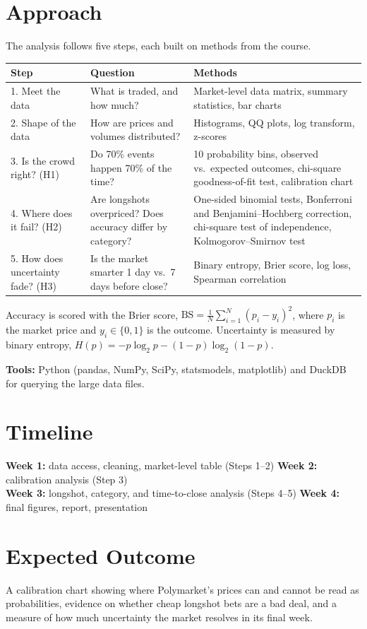 \documentclass[10pt]{article}
\begin{document}
\section{Approach}
The analysis follows five steps, each built on methods from the course.

\begin{tabularx}{\textwidth}{@{}l Y Y@{}}
\toprule
\textbf{Step} & \textbf{Question} & \textbf{Methods} \\
. Meet the data & What is traded, and how much? & Market-level data matrix, summary statistics, bar charts \\
2. Shape of the data & How are prices and volumes distributed? & Histograms, QQ plots, log transform, z-scores \\
3. Is the crowd right? (H1) & Do 70\% events happen 70\% of the time? & 10 probability bins, observed vs.\ expected outcomes, chi-square goodness-of-fit test, calibration chart \\
4. Where does it fail? (H2) & Are longshots overpriced? Does accuracy differ by category? & One-sided binomial tests, Bonferroni and Benjamini--Hochberg correction, chi-square test of independence, Kolmogorov--Smirnov test \\
5. How does uncertainty fade? (H3) & Is the market smarter 1 day vs.\ 7 days before close? & Binary entropy, Brier score, log loss, Spearman correlation \\
\bottomrule
\end{tabularx}

Accuracy is scored with the Brier score,
$\mathrm{BS} = \frac{1}{N}\sum_{i=1}^{N}(p_i - y_i)^2$, where $p_i$ is the market price and
$y_i \in \{0,1\}$ is the outcome. Uncertainty is measured by binary entropy,
$H(p) = -p\log_2 p - (1-p)\log_2(1-p)$.

\textbf{Tools:} Python (pandas, NumPy, SciPy, statsmodels, matplotlib) and DuckDB for querying the large data files.

\section{Timeline}
\textbf{Week 1:} data access, cleaning, market-level table (Steps 1--2) \quad
\textbf{Week 2:} calibration analysis (Step 3) \\
\textbf{Week 3:} longshot, category, and time-to-close analysis (Steps 4--5) \quad
\textbf{Week 4:} final figures, report, presentation

\section{Expected Outcome}
A calibration chart showing where Polymarket's prices can and cannot be read as probabilities,
evidence on whether cheap longshot bets are a bad deal, and a measure of how much uncertainty
the market resolves in its final week.
\end{document}
